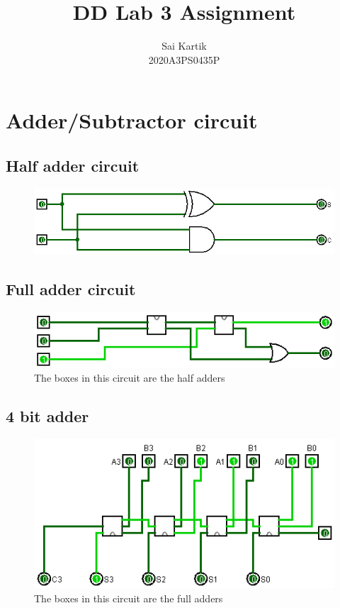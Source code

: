 \documentclass[12pt]{article}
\title{DD Lab 3 Assignment}
\author{Sai Kartik \\2020A3PS0435P}
\begin{document}
    \maketitle
    \section{Adder/Subtractor circuit}
        \subsection{Half adder circuit}
        \begin{center}
            \begin{figure}[ht]
                \includegraphics[scale=0.50]{halfadder.png}
            \end{figure}
        \end{center}
    \subsection{Full adder circuit}
    \begin{center}
        \begin{figure}[ht]
            \includegraphics[scale=0.50]{fulladder.png}
            \caption{The boxes in this circuit are the half adders}
        \end{figure}
    \end{center}
    \newpage
    \subsection{4 bit adder}
    \begin{center}
        \begin{figure}[ht]
            \includegraphics[scale=0.50]{4adder.png}
            \caption{The boxes in this circuit are the full adders}
        \end{figure}
    \end{center}
\end{document}
